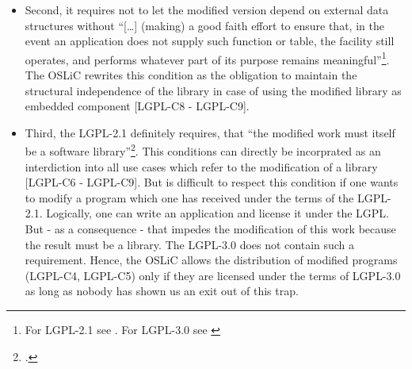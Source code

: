 \begin{itemize}
\begin{itemize}
    \item Second, it requires not to let the modified version depend on external
    data structures without \enquote{[\ldots] (making) a good faith effort to
    ensure that, in the event an application does not supply such function or
    table, the facility still operates, and performs whatever part of its
    purpose remains meaningful}\footnote{For LGPL-2.1 see \cite[cf.][\nopage
    wp.\ §2d]{Lgpl21OsiLicense1999a}. For LGPL-3.0 see \cite[cf.][\nopage wp.\
    §2a]{Lgpl30OsiLicense2007a}}. The OSLiC rewrites this condition as the
    obligation to maintain the structural independence of the library in case of
    using the modified library as embedded component [LGPL-C8 - LGPL-C9].
    
    \item \label{para:libislib}Third, the LGPL-2.1 definitely requires, that
    \enquote{the modified work must itself be a software
    library}\footcite[cf.][\nopage wp.\ §2]{Lgpl21OsiLicense1999a}. This
    conditions can directly be incorprated as an interdiction into all use cases
    which refer to the modification of a library [LGPL-C6 - LGPL-C9]. But is
    difficult to respect this condition if one wants to modify a program which
    one has received under the terms of the LGPL-2.1. Logically, one can write
    an application and license it under the LGPL. But - as a consequence - that
    impedes the modification of this work because the result must be a library.
    The LGPL-3.0 does not contain such a requirement. Hence, the OSLiC allows
    the distribution of modified programs (LGPL-C4, LGPL-C5) only if they are
    licensed under the terms of LGPL-3.0 as long as nobody has shown us an exit
    out of this trap.
  \end{itemize}
  

\end{itemize}
